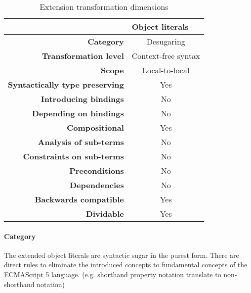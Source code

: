 \documentclass[10pt,a4paper]{article}
\begin{document}
\begin{table}[H]
\centering
\caption{Extension transformation dimensions}
\label{object-literals-table}
\begin{tabular}{@{}rc@{}}
\toprule
                                       & \multicolumn{1}{l}{\textbf{Object literals}} \\ \midrule
\textbf{Category}                      & Desugaring
\\
\textbf{Transformation level}          & Context-free syntax                          \\
\textbf{Scope}                         & Local-to-local                               \\
\textbf{Syntactically type preserving} & Yes                                          \\
\textbf{Introducing bindings}          & No                                          \\%
\textbf{Depending on bindings}         & No                                           \\
\textbf{Compositional}                 & Yes                                          \\
\textbf{Analysis of sub-terms}          & No                                          \\
\textbf{Constraints on sub-terms}       & No                                           \\
\textbf{Preconditions}                 & No                                          \\
\textbf{Dependencies}                  & No                                           \\
\textbf{Backwards compatible}          & Yes                                          \\
\textbf{Dividable}                     & Yes                                           \\ \bottomrule
\end{tabular}
\end{table}

\paragraph{Category}
The extended object literals are syntactic sugar in the purest form. There are direct rules to eliminate the introduced concepts to fundamental concepts of the ECMAScript 5 language. (e.g. shorthand property notation translate to non-shorthand notation)
\end{document}
